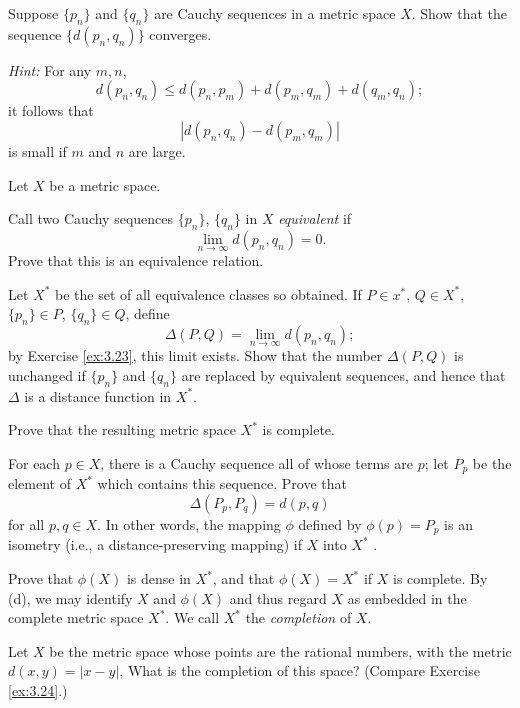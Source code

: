 \begin{myExercise}
    \label{ex:3.23}
    Suppose $\{p_n\}$ and $\{q_n\}$ are Cauchy sequences in a metric space $X$. 
    Show that the sequence $\{d(p_n, q_n)\}$ converges. 
    
    \emph{Hint:} For any $m, n$,
    \begin{equation*}
        d(p_n, q_n) \leq d(p_n, p_m) + d(p_m, q_m) + d(q_m , q_n);
    \end{equation*}
    it follows that 
    \begin{equation*}
        \left| d(p_n, q_n) - d(p_m, q_m) \right| 
    \end{equation*}
    is small if $m$ and $n$ are large.
\end{myExercise}


\begin{myExercise}
    \label{ex:3.24}
    Let $X$ be a metric space.
    \begin{asparaenum}[(a)]
        \item Call two Cauchy sequences $\{p_n\}$, $\{q_n\}$ in $X$ \emph{equivalent} if
        \begin{equation*}
            \lim_{n \to \infty}  d(p_n, q_n) = 0.
        \end{equation*}
        Prove that this is an equivalence relation.
        \item Let $X^*$ be the set of all equivalence classes so obtained. If $P \in x^*$, $Q \in X^*$, $\{p_n\} \in P$, $\{q_n\} \in Q$, define
        \begin{equation*}
            \Delta(P, Q) = \lim_{n \to \infty} d (p_n, q_n) ;
        \end{equation*}
        by Exercise \ref{ex:3.23}, this limit exists. Show that the number $\Delta(P, Q)$ is unchanged if $\{p_n\}$ and $\{q_n\}$ are replaced by equivalent sequences, and hence that $\Delta$ is a distance
        function in $X^*$.
        \item Prove that the resulting metric space $X^*$ is complete.
        \item For each $p \in X$, there is a Cauchy sequence all of whose terms are $p$; let $P_p$ be the element of $X^*$ which contains this sequence. Prove that
        \begin{equation*}
            \Delta(P_p, P_q) = d(p, q)
        \end{equation*}
        for all $p, q \in X$. 
        In other words, the mapping $\phi$ defined by $\phi(p) = P_p$ is an isometry (i.e., a distance-preserving mapping) if $X$ into $X^*$ .
        \item Prove that $\phi(X)$ is dense in $X^*$, and that $\phi(X) = X^*$ if $X$ is complete. By (d), we may identify $X$ and $\phi(X)$ and thus regard $X$ as embedded in the complete metric space $X^*$. We call $X^*$ the \emph{completion} of $X$.
    \end{asparaenum}
\end{myExercise}


\begin{myExercise}
    \label{ex:3.25}
    Let $X$ be the metric space whose points are the rational numbers, with the metric $d(x, y) =|x - y|$, What is the completion of this space? (Compare Exercise \ref{ex:3.24}.)
\end{myExercise}